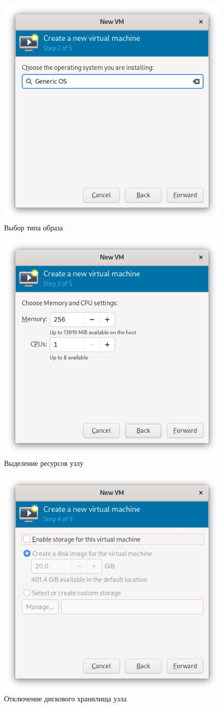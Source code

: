 \begin{figure}[H]
	\centering
	\includegraphics[width=0.5\linewidth]{2-02}
	\caption{Выбор типа образа}
	\label{nodes/02}
\end{figure}

\begin{figure}[H]
	\centering
	\includegraphics[width=0.5\linewidth]{2-03}
	\caption{Выделение ресурсов узлу}
	\label{nodes/03}
\end{figure}

\begin{figure}[H]
	\centering
	\includegraphics[width=0.5\linewidth]{2-04}
	\caption{Отключение дискового хранилища узла}
	\label{nodes/04}
\end{figure}

